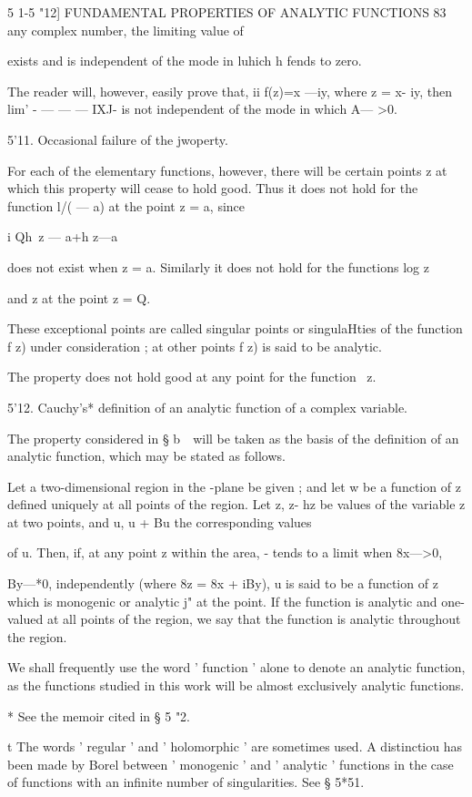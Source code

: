 5 1-5 "12] FUNDAMENTAL PROPERTIES OF ANALYTIC FUNCTIONS 83 any complex
number, the limiting value of

exists and is independent of the mode in luhich h fends to zero.

The reader will, however, easily prove that, ii f(z)=x —iy, where z =
x- iy, then lim' - — — — IXJ- is not independent of the mode in which
A— >0.

5'11. Occasional failure of the jwoperty.

For each of the elementary functions, however, there will be certain
points z at which this property will cease to hold good. Thus it does
not hold for the function l/( — a) at the point z = a, since

 i Qh\ z — a+h z—a

does not exist when z = a. Similarly it does not hold for the
functions log z

and z at the point z = Q.

These exceptional points are called singular points or singulaHties of
the function f z) under consideration ; at other points f z) is said
to be analytic.

The property does not hold good at any point for the function \ z.

5'12. Cauchy's* definition of an analytic function of a complex
variable.

The property considered in § b\ \ will be taken as the basis of the
definition of an analytic function, which may be stated as follows.

Let a two-dimensional region in the -plane be given ; and let w be a
function of z defined uniquely at all points of the region. Let z, z-
hz be values of the variable z at two points, and u, u + Bu the
corresponding values

of u. Then, if, at any point z within the area, - tends to a limit
when 8x—>0,

By—*0, independently (where 8z = 8x + iBy), u is said to be a function
of z which is monogenic or analytic j" at the point. If the function
is analytic and one-valued at all points of the region, we say that
the function is analytic throughout the region.

We shall frequently use the word ' function ' alone to denote an
analytic function, as the functions studied in this work will be
almost exclusively analytic functions.

* See the memoir cited in § 5 "2.

t The words ' regular ' and ' holomorphic ' are sometimes used. A
distinctiou has been made by Borel between ' monogenic ' and '
analytic ' functions in the case of functions with an infinite number
of singularities. See § 5*51.

